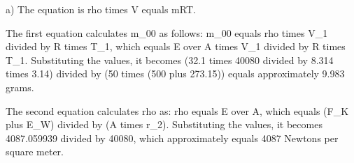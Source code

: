a) The equation is rho times V equals mRT.

The first equation calculates m_00 as follows:
m_00 equals rho times V_1 divided by R times T_1, which equals E over A times V_1 divided by R times T_1. Substituting the values, it becomes (32.1 times 40080 divided by 8.314 times 3.14) divided by (50 times (500 plus 273.15)) equals approximately 9.983 grams.

The second equation calculates rho as:
rho equals E over A, which equals (F_K plus E_W) divided by (A times r_2). Substituting the values, it becomes 4087.059939 divided by 40080, which approximately equals 4087 Newtons per square meter.